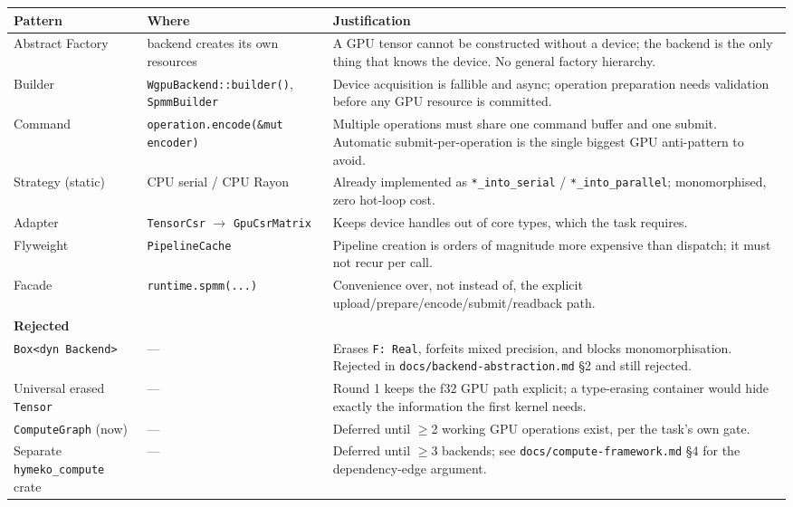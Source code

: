\documentclass[11pt,a4paper]{article}
\begin{document}
\begin{longtable}{p{}p{}p{}}
\toprule
\textbf{Pattern} & \textbf{Where} & \textbf{Justification} \\
\midrule
Abstract Factory & backend creates its own resources
& A GPU tensor cannot be constructed without a device; the backend is the only
  thing that knows the device. No general factory hierarchy. \\
\addlinespace
Builder & \texttt{WgpuBackend::builder()}, \texttt{SpmmBuilder}
& Device acquisition is fallible and async; operation preparation needs
  validation before any GPU resource is committed. \\
\addlinespace
Command & \texttt{operation.encode(\&mut encoder)}
& Multiple operations must share one command buffer and one submit. Automatic
  submit-per-operation is the single biggest GPU anti-pattern to avoid. \\
\addlinespace
Strategy (static) & CPU serial / CPU Rayon
& Already implemented as \texttt{*\_into\_serial} / \texttt{*\_into\_parallel};
  monomorphised, zero hot-loop cost. \\
\addlinespace
Adapter & \texttt{TensorCsr} $\rightarrow$ \texttt{GpuCsrMatrix}
& Keeps device handles out of core types, which the task requires. \\
\addlinespace
Flyweight & \texttt{PipelineCache}
& Pipeline creation is orders of magnitude more expensive than dispatch; it
  must not recur per call. \\
\addlinespace
Facade & \texttt{runtime.spmm(...)}
& Convenience over, not instead of, the explicit
  upload/prepare/encode/submit/readback path. \\
\midrule
\textbf{Rejected} & & \\
\midrule
\texttt{Box<dyn Backend>} & --- & Erases \texttt{F: Real}, forfeits mixed
  precision, and blocks monomorphisation. Rejected in
  \texttt{docs/backend-abstraction.md} \S2 and still rejected. \\
\addlinespace
Universal erased \texttt{Tensor} & --- & Round 1 keeps the f32 GPU path
  explicit; a type-erasing container would hide exactly the information the
  first kernel needs. \\
\addlinespace
\texttt{ComputeGraph} (now) & --- & Deferred until $\ge$2 working GPU
  operations exist, per the task's own gate. \\
\addlinespace
Separate \texttt{hymeko\_compute} crate & --- & Deferred until $\ge$3 backends;
  see \texttt{docs/compute-framework.md} \S4 for the dependency-edge argument. \\
\bottomrule
\end{longtable}
\end{document}
